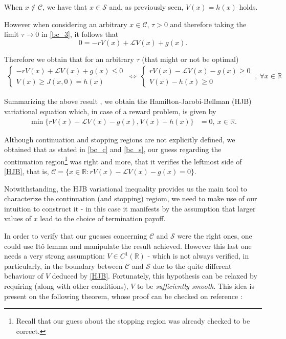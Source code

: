 When $x \notin \mathcal{C}$, we have that $x \in \mathcal{S}$ and, as previously seen, $V(x)=h(x)$ holds.

However when considering an arbitrary $x \in \mathcal{C}$, $\tau>0$ and therefore taking the limit $\tau \rightarrow 0$ in \eqref{bc_3}, it follows that
$$0=-rV(x)+\mathcal{L}V(x)+g(x).$$

Therefore we obtain that for an arbitrary $\tau$ (that might or not be optimal)
\begin{align}
\begin{cases} 
-rV(x)+\mathcal{L}V(x)+g(x) \leq 0 \\
V(x) \geq J(x,0)=h(x)
\end{cases}
\ \Leftrightarrow \
\begin{cases} 
rV(x)-\mathcal{L}V(x)-g(x) \geq 0 \\
V(x)- h(x) \geq 0
\end{cases}
\ , \ \forall x \in \mathds{R}
\end{align}


Summarizing the above result , we obtain the Hamilton-Jacobi-Bellman (HJB) variational equation which, in case of a reward problem, is given by
\begin{align}
 \min \{ r V(x)-\mathcal{L}V(x)-g(x), V(x)-h(x) \}&=0, \ x\in \mathds{R}.
\label{HJB}
\end{align}

Although continuation and stopping regions are not explicitly defined, we obtained that as stated in \eqref{bc_c} and \eqref{bc_s}, our guess regarding the continuation region\footnote{Recall that our guess about the stopping region was already checked to be correct.} was right and more, that it verifies the leftmost side of \eqref{HJB}, that is,
$\mathcal{C}=\{ x\in \mathds{R}: r V(x)-\mathcal{L}V(x)-g(x)=0 \}.$

Notwithstanding, the HJB variational inequality provides us the main tool to characterize the continuation (and stopping) regiom, we need to make use of our intuition to construct it - in this case it manifests by the assumption that larger values of $x$ lead to the choice of termination payoff.

In order to verify that our guesses concerning $\mathcal{C}$ and $\mathcal{S}$ were the right ones, one could use Itô lemma and manipulate the result achieved. However this last one needs a very strong assumption: $V \in C^1(\mathds{R})$ - which is not always verified, in particularly, in the boundary between $\mathcal{C}$ and $\mathcal{S}$ due to the quite different behaviour of $V$ deduced by \eqref{HJB}. Fortunately, this hypothesis can be relaxed by requiring (along with other conditions), $V$ to be \textit{sufficiently smooth}. This idea is present on the following theorem, whose proof can be checked on reference \cite{ross}:

